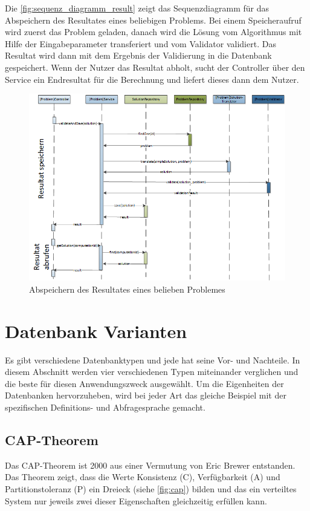 Die \autoref{fig:sequenz_diagramm_result} zeigt das Sequenzdiagramm für das Abspeichern des Resultates eines beliebigen Problems. Bei einem Speicheraufruf wird zuerst das Problem 
geladen, danach wird die Lösung vom Algorithmus mit Hilfe der Eingabeparameter transferiert und vom Validator validiert. Das Resultat wird dann mit dem Ergebnis der Validierung in die 
Datenbank gespeichert. Wenn der Nutzer das Resultat abholt, sucht der Controller über den Service ein Endresultat für die Berechnung und liefert dieses dann dem Nutzer.

\begin{figure}[h]
\centering
\includegraphics[scale=0.8]{images/visio/sequenz_diagramm_result.png}
\caption[Abspeichern des Resultates eines belieben Problemes]{Abspeichern des Resultates eines belieben Problemes \selfmade{}}
\label{fig:sequenz_diagramm_result}
\end{figure}

\section{Datenbank Varianten}\label{db_varianten}
Es gibt verschiedene Datenbanktypen und jede hat seine Vor- und Nachteile. In diesem Abschnitt werden vier verschiedenen Typen miteinander verglichen und die beste für diesen 
Anwendungszweck ausgewählt. Um die Eigenheiten der Datenbanken hervorzuheben, wird bei jeder Art das gleiche Beispiel mit der spezifischen Definitions- und Abfragesprache gemacht.

\subsection{CAP-Theorem}\label{cap_theorem}
Das CAP-Theorem ist 2000 aus einer Vermutung von Eric Brewer entstanden. Das Theorem zeigt, dass die Werte Konsistenz (C), Verfügbarkeit (A) und Partitionstoleranz (P) ein 
Dreieck (siehe \autoref{fig:cap}) bilden und das ein verteiltes System nur jeweils zwei dieser Eigenschaften gleichzeitig erfüllen kann.

